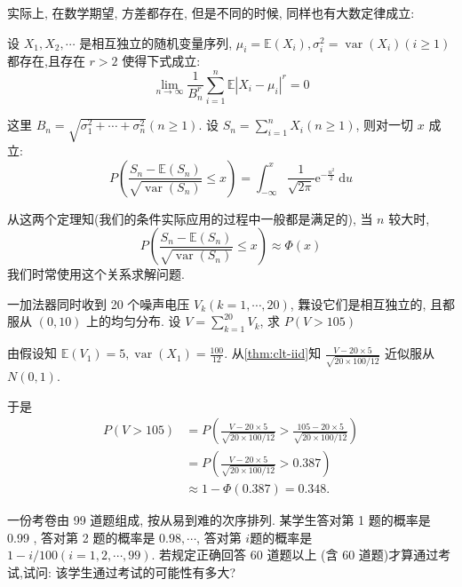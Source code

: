     实际上, 在数学期望, 方差都存在, 但是不同的时候, 同样也有大数定律成立: 

    \begin{theorem}
        \label{thm:clt-gen}
        设 $X_1, X_2, \cdots$ 是相互独立的随机变量序列, $\mu_i=\mathbb{E}\left(X_i\right), \sigma_i^2=\operatorname{var}\left(X_i\right)(i \geqslant 1)$ 都存在,且存在 $r>2$ 使得下式成立:
$$
\lim _{n \rightarrow \infty} \frac{1}{B_n^r} \sum_{i=1}^n \mathbb{E}\left|X_i-\mu_i\right|^r=0
$$

这里 $B_n=\sqrt{\sigma_1^2+\cdots+\sigma_n^2}(n \geqslant 1)$. 设 $S_n=\sum_{i=1}^n X_i(n \geqslant 1)$, 则对一切 $x$ 成立:
$$
P\left(\frac{S_n-\mathbb{E}\left(S_n\right)}{\sqrt{\operatorname{var}\left(S_n\right)}} \leq x\right)=\int_{-\infty}^x \frac{1}{\sqrt{2 \pi}} \mathrm{e}^{-\frac{u^2}{2}} \mathrm{~d} u
$$
    \end{theorem}

    从这两个定理知(我们的条件实际应用的过程中一般都是满足的), 当 $n$ 较大时,
$$
P\left(\frac{S_n-\mathbb{E}\left(S_n\right)}{\sqrt{\operatorname{var}\left(S_n\right)}} \leq x\right) \approx \Phi(x)
$$
     我们时常使用这个关系求解问题. 

     \begin{example}
        一加法器同时收到 20 个噪声电压 $V_k(k=1, \cdots, 20)$, 橆设它们是相互独立的, 且都服从 $(0,10)$ 上的均匀分布. 设 $V=\sum_{k=1}^{20} V_k$, 求 $P(V>105)$
     \end{example}

     \begin{solution}
        由假设知 $\mathbb{E}\left(V_1\right)=5, \operatorname{var}\left(X_1\right)=\frac{100}{12}$. 从\cref{thm:clt-iid}知 $\frac{V-20 \times 5}{\sqrt{20 \times 100 / 12}}$ 近似服从 $N(0,1)$.

        于是
        $$
        \begin{aligned}
        P(V>105) & =P\left(\frac{V-20 \times 5}{\sqrt{20 \times 100 / 12}}>\frac{105-20 \times 5}{\sqrt{20 \times 100 / 12}}\right) \\
        & =P\left(\frac{V-20 \times 5}{\sqrt{20 \times 100 / 12}}>0.387\right) \\
        & \approx 1-\Phi(0.387)=0.348 .
        \end{aligned}
        $$ 
     \end{solution}


     \begin{example}
        一份考卷由 99 道题组成, 按从易到难的次序排列. 某学生答对第 1 题的概率是 0.99 , 答对第 2 题的概率是 $0.98, \cdots$, 答对第 $i$题的概率是 $1-i / 100(i=1,2, \cdots, 99)$. 若规定正确回答 60 道题以上 (含 60 道题)才算通过考试,试问: 该学生通过考试的可能性有多大?
     \end{example}

